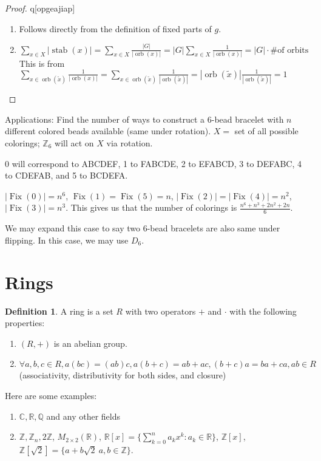 \documentclass{article}
\theoremstyle{definition}
\newtheorem{definition}{Definition}
\theoremstyle{plain}
\theoremstyle{corollary}
\theoremstyle{lemma}
\DeclareMathOperator{\orb}{orb}
\DeclareMathOperator{\stab}{stab}
\DeclareMathOperator{\Fix}{Fix}
\begin{document}
\begin{proof}
    q[opgeajiap]
    \begin{enumerate}
        \item Follows directly from the definition of fixed parts of $g$.
        \item $\sum_{x\in X}|\stab(x)|=\sum_{x\in X}\frac {|G|}{|\orb(x)|}=|G|\sum_{x\in X}\frac 1 {|\orb(x)|}=|G|\cdot\text{\# of orbits}$
        This is from $\sum_{x\in\orb(\tilde{x})}\frac 1{|\orb(x)|}=\sum_{x\in\orb(\tilde{x})}\frac 1{|\orb(\tilde{x})|}=|\orb(\tilde{x})|\frac 1{|\orb(\tilde x)|}=1$
    \end{enumerate}
\end{proof}

Applications: Find the number of ways to construct a 6-bead bracelet with $n$ different colored beads available (same under rotation). $X=$ set of all possible colorings; $\mathbb{Z}_6$ will act on $X$ via rotation.

0 will correspond to ABCDEF, 1 to FABCDE, 2 to EFABCD, 3 to DEFABC, 4 to CDEFAB, and 5 to BCDEFA.

$|\Fix(0)|=n^6$, $\Fix(1)=\Fix(5)=n$, $|\Fix(2)|=|\Fix(4)|=n^2$, $|\Fix(3)|=n^3$. This gives us that the number of colorings is $\frac {n^6+n^3+2n^2+2n}{6}$.

We may expand this case to say two 6-bead bracelets are also same under flipping. In this case, we may use $D_6$.

\section{Rings}

\begin{definition}
    A ring is a set $R$ with two operators $+$ and $\cdot$ with the following properties:
    \begin{enumerate}
        \item $(R,+)$ is an abelian group.
        \item $\forall a,b,c\in R,a(bc)=(ab)c,a(b+c)=ab+ac,(b+c)a=ba+ca,ab\in R$ (associativity, distributivity for both sides, and closure)
    \end{enumerate}
\end{definition}

Here are some examples:
\begin{enumerate}
    \item $\mathbb{C},\mathbb{R},\mathbb{Q}$ and any other fields
    \item $\mathbb{Z},\mathbb{Z}_n,2\mathbb{Z}$, $M_{2\times2}(\mathbb{R})$, $\mathbb{R}[x]=\{\sum_{k=0}^na_kx^k:a_k\in\mathbb{R}\}$, $\mathbb{Z}[x]$, $\mathbb{Z}[\sqrt2]=\{a+b\sqrt2\:a,b\in\mathbb{Z}\}$.
\end{enumerate}
\end{document}
